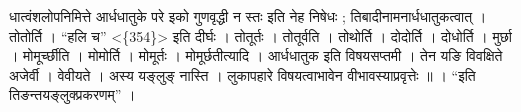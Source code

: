धात्वंशलोपनिमित्ते आर्धधातुके परे इको गुणवृद्धी न स्तः इति नेह निषेधः ;
तिबादीनामनार्धधातुकत्वात् । तोतोर्ति । ``हलि च''
\textless{}\{354\}\textgreater{} इति दीर्घः । तोतूर्तः । तोतूर्वति ।
तोथोर्ति । दोदोर्ति । दोधोर्ति । मुर्छा । मोमूर्च्छीति । मोमोर्ति ।
मोमूर्तः । मोमूर्छतीत्यादि । आर्धधातुक इति विषयसप्तमी । तेन यङि
विवक्षिते अजेर्वी । वेवीयते । अस्य यङ्लुङ् नास्ति । लुकापहारे
विषयत्वाभावेन वीभावस्याप्रवृत्तेः ॥ । ``इति तिङन्तयङ्लुक्प्रकरणम्''‌ ।
